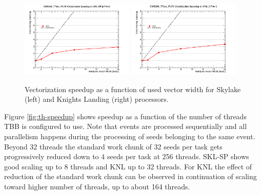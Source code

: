 \documentclass{webofc}
\def\twop{0.48\textwidth}
\def\postfigskip{\vskip-4mm}
\begin{document}
\begin{figure}[htb]
  \centering
  \includegraphics[width=\twop]{figs/comp/SKL-SP_CMSSW_TTbar_PU70_VU_speedup.png}
  \hfill
  \includegraphics[width=\twop]{figs/comp/KNL_CMSSW_TTbar_PU70_VU_speedup.png}
  \postfigskip

  \caption{Vectorization speedup as a function of used vector width for
    Skylake (left) and Knights Landing (right)
    processors.}
  \label{fig:vu-speedup}
\end{figure}

Figure \ref{fig:th-speedup} shows speedup as a function of the number of threads
TBB is configured to use. Note that events are processed sequentially and all
parallelism happens during the processing of seeds belonging to the same
event. Beyond 32 threads the standard work chunk of 32 seeds per task gets
progressively reduced down to 4 seeds per task at 256 threads.
SKL-SP shows good scaling up to 8 threads and KNL up to 32 threads.
For KNL the effect of reduction of the standard work chunk can be observed
in continuation of scaling toward higher number of threads, up to 
about 164 threads.
\end{document}

